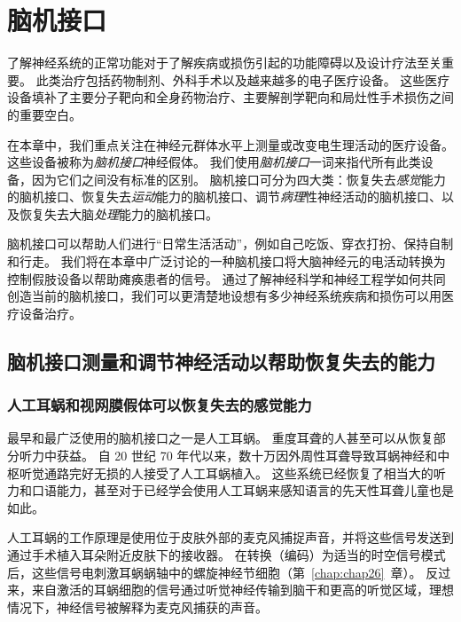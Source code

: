 \chapter{脑机接口} \label{chap:chap39}

了解神经系统的正常功能对于了解疾病或损伤引起的功能障碍以及设计疗法至关重要。
此类治疗包括药物制剂、外科手术以及越来越多的电子医疗设备。
这些医疗设备填补了主要分子靶向和全身药物治疗、主要解剖学靶向和局灶性手术损伤之间的重要空白。





在本章中，我们重点关注在神经元群体水平上测量或改变电生理活动的医疗设备。
这些设备被称为\textit{脑机接口}神经假体。
我们使用\textit{脑机接口}一词来指代所有此类设备，因为它们之间没有标准的区别。
脑机接口可分为四大类：恢复失去\textit{感觉}能力的脑机接口、恢复失去\textit{运动}能力的脑机接口、调节\textit{病理}性神经活动的脑机接口、以及恢复失去大脑\textit{处理}能力的脑机接口。


脑机接口可以帮助人们进行“日常生活活动”，例如自己吃饭、穿衣打扮、保持自制和行走。
我们将在本章中广泛讨论的一种脑机接口将大脑神经元的电活动转换为控制假肢设备以帮助瘫痪患者的信号。
通过了解神经科学和神经工程学如何共同创造当前的脑机接口，我们可以更清楚地设想有多少神经系统疾病和损伤可以用医疗设备治疗。



\section{脑机接口测量和调节神经活动以帮助恢复失去的能力}

\subsection{人工耳蜗和视网膜假体可以恢复失去的感觉能力}

最早和最广泛使用的脑机接口之一是人工耳蜗。
重度耳聋的人甚至可以从恢复部分听力中获益。
自 20 世纪 70 年代以来，数十万因外周性耳聋导致耳蜗神经和中枢听觉通路完好无损的人接受了人工耳蜗植入。 
这些系统已经恢复了相当大的听力和口语能力，甚至对于已经学会使用人工耳蜗来感知语言的先天性耳聋儿童也是如此。


人工耳蜗的工作原理是使用位于皮肤外部的麦克风捕捉声音，并将这些信号发送到通过手术植入耳朵附近皮肤下的接收器。
在转换（编码）为适当的时空信号模式后，这些信号电刺激耳蜗蜗轴中的螺旋神经节细胞（第~\ref{chap:chap26}~章）。
反过来，来自激活的耳蜗细胞的信号通过听觉神经传输到脑干和更高的听觉区域，理想情况下，神经信号被解释为麦克风捕获的声音。


